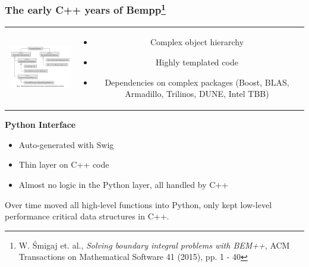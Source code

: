 \documentclass[dvipsnames,10pt]{beamer}
\begin{document}
\begin{frame}
	\frametitle{The early C++ years of Bempp\footnote{\tiny W. \'{S}migaj et. al., \textit{Solving boundary integral problems with BEM++}, ACM Transactions on Mathematical Software 41 (2015), pp. 1 - 40}}
	
	\begin{tabular}{cc}
		\begin{minipage}{6cm}
			\begin{center}
			\includegraphics[width=5cm]{../figs/bempp_cpp_objects}
			\end{center}
		\end{minipage} &
		\begin{minipage}{5cm}
			\small
			\begin{itemize}
			\item Complex object hierarchy
			\item Highly templated code
			\item Dependencies on complex packages (Boost, BLAS, Armadillo, Trilinos, DUNE, Intel TBB)
			\end{itemize}
		\end{minipage}
	\end{tabular}
	
	\vspace{\baselineskip}
	
	\textbf{Python Interface}
	
	\begin{itemize}
		\item Auto-generated with Swig
		\item Thin layer on C++ code
		\item Almost no logic in the Python layer, all handled by C++
	\end{itemize}

\begin{tcolorbox}
Over time moved all high-level functions into Python, only kept low-level performance critical data structures in C++.
\end{tcolorbox}

\end{frame}
\end{document}

